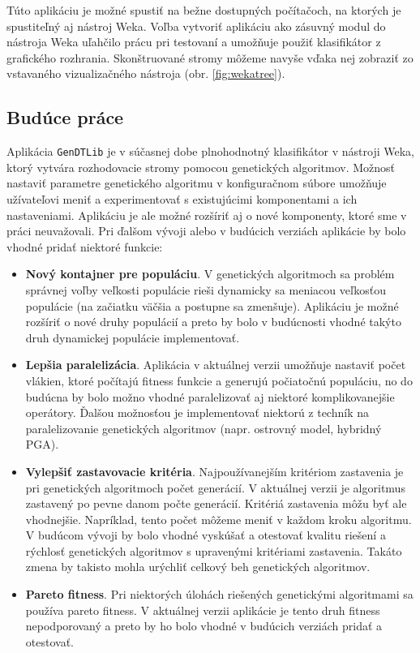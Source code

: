 Túto aplikáciu je možné spustiť na bežne dostupných počítačoch, na ktorých je spustiteľný aj nástroj Weka. 
Voľba vytvoriť aplikáciu ako zásuvný modul do nástroja Weka uľahčilo prácu pri testovaní a umožňuje použiť klasifikátor z grafického rozhrania. Skonštruované stromy môžeme navyše vďaka nej zobraziť zo vstavaného vizualizačného nástroja (obr. \ref{fig:wekatree}).

\subsection{Budúce práce}
Aplikácia \verb|GenDTLib| je v súčasnej dobe plnohodnotný klasifikátor v nástroji Weka, ktorý vytvára rozhodovacie stromy pomocou genetických algoritmov. Možnosť nastaviť parametre genetického algoritmu v konfiguračnom súbore umožňuje užívateľovi meniť a experimentovať s existujúcimi komponentami a ich nastaveniami. Aplikáciu je ale možné rozšíriť aj o nové komponenty, ktoré sme v práci neuvažovali. Pri ďalšom vývoji alebo v budúcich verziách aplikácie by bolo vhodné pridať niektoré funkcie:

\begin{itemize}
\item \textbf{Nový kontajner pre populáciu}. V genetických algoritmoch sa problém správnej voľby veľkosti populácie rieši dynamicky sa meniacou veľkosťou populácie (na začiatku väčšia a postupne sa zmenšuje). Aplikáciu je možné rozšíriť o nové druhy populácií a preto by bolo v budúcnosti vhodné takýto druh dynamickej populácie implementovať.
\item \textbf{Lepšia paralelizácia}. Aplikácia v aktuálnej verzii umožňuje nastaviť počet vlákien, ktoré počítajú fitness funkcie a generujú počiatočnú populáciu, no do budúcna by bolo možno vhodné paralelizovať aj niektoré komplikovanejšie operátory. Ďalšou možnosťou je implementovať niektorú z techník na paralelizovanie genetických algoritmov (napr. ostrovný model, hybridný PGA).
\item \textbf{Vylepšiť zastavovacie kritéria}. Najpoužívanejším kritériom zastavenia je pri genetických algoritmoch počet generácií. V aktuálnej verzii je algoritmus zastavený po pevne danom počte generácií. Kritériá zastavenia môžu byť ale vhodnejšie. Napríklad, tento počet môžeme meniť v každom kroku algoritmu. V budúcom vývoji by bolo vhodné vyskúšať a otestovať kvalitu riešení a rýchlosť genetických algoritmov s upravenými kritériami zastavenia. Takáto zmena by takisto mohla urýchliť celkový beh genetických algoritmov.
\item \textbf{Pareto fitness}. Pri niektorých úlohách riešených genetickými algoritmami sa používa pareto fitness. V aktuálnej verzii aplikácie je tento druh fitness nepodporovaný a preto by ho bolo vhodné v budúcich verziách pridať a otestovať.
\end{itemize}